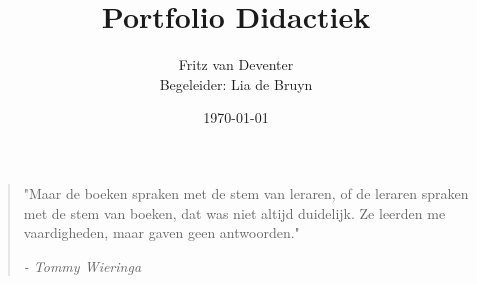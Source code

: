 \documentclass{article}
\title{Portfolio Didactiek}
\author{Fritz van Deventer\\ Begeleider: Lia de Bruyn}
\date{\today}
\begin{document}
 
\maketitle


\begin{quote}
  "Maar de boeken spraken met de stem van leraren, of de leraren spraken met de stem van boeken, dat was niet altijd duidelijk. Ze leerden me vaardigheden, maar gaven geen antwoorden."
  \begin{flushright}
    \textit{ - Tommy Wieringa\nocite{speedboot}}
  \end{flushright}
\end{quote}


\clearpage

\tableofcontents
\clearpage









\clearpage
\begin{appendices}










\end{appendices}
\end{document}
